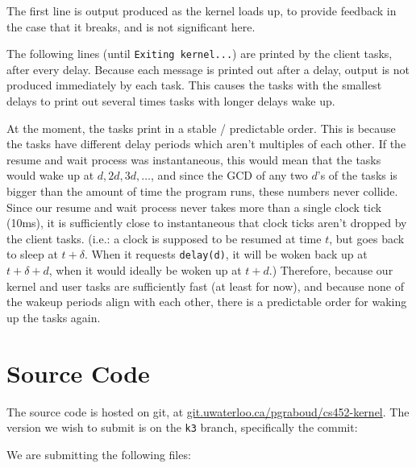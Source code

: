 \documentclass[titlepage]{article}
\begin{document}
The first line is output produced as the kernel loads up, to provide feedback in the case that it breaks,
and is not significant here.

The following lines (until \texttt{Exiting kernel...}) are printed by the client tasks, after every delay.
Because each message is printed out after a delay, output is not produced immediately by each task.
This causes the tasks with the smallest delays to print out several times tasks with longer delays wake up.

At the moment, the tasks print in a stable / predictable order.
This is because the tasks have different delay periods which aren't multiples of each other.
If the resume and wait process was instantaneous, this would mean that the tasks would wake up at $d, 2d, 3d, \ldots$,
and since the GCD of any two $d$'s of the tasks is bigger than the amount of time the program runs, these
numbers never collide.
Since our resume and wait process never takes more than a single clock tick (10ms), it is sufficiently close to instantaneous
that clock ticks aren't dropped by the client tasks.
(i.e.: a clock is supposed to be resumed at time $t$, but goes back to sleep at $t + \delta$.
When it requests \texttt{delay(d)}, it will be woken back up at $t + \delta + d$, when it would ideally
be woken up at $t + d$.)
Therefore, because our kernel and user tasks are sufficiently fast (at least for now), and because
none of the wakeup periods align with each other, there is a predictable order for waking up the tasks again.

\section{Source Code}
The source code is hosted on git, at \url{git.uwaterloo.ca/pgraboud/cs452-kernel}.
The version we wish to submit is on the \texttt{k3} branch, specifically
the commit:

We are submitting the following files:


\end{document}
